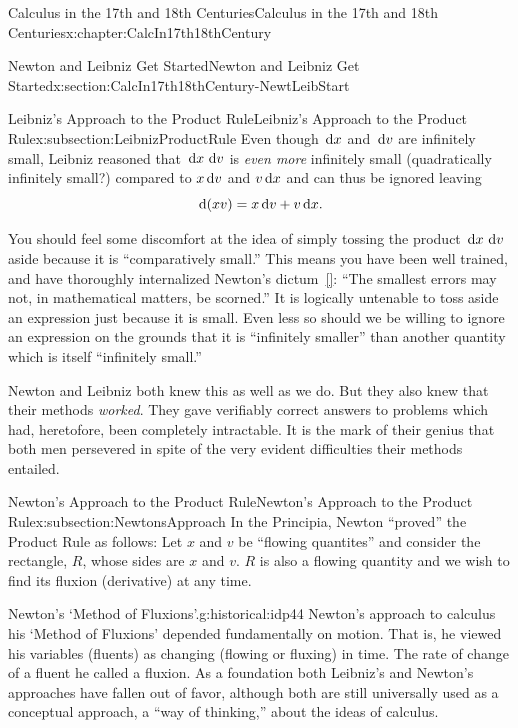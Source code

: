 \begin{chapterptx}{Calculus in the 17th and 18th Centuries}{}{Calculus in the 17th and 18th Centuries}{}{}{x:chapter:CalcIn17th18thCentury}
\begin{sectionptx}{Newton and Leibniz Get Started}{}{Newton and Leibniz Get Started}{}{}{x:section:CalcIn17th18thCentury-NewtLeibStart}
\begin{subsectionptx}{Leibniz's Approach to the Product Rule}{}{Leibniz's Approach to the Product Rule}{}{}{x:subsection:LeibnizProductRule}
			Even though \(\,{\rm d} x\) and \(\,{\rm d} v\) are infinitely small, Leibniz reasoned that \(\,{\rm d} x\,\,{\rm d} v\) is \emph{even more} infinitely small (quadratically infinitely small?)  compared to \(x\,{\rm d} v\) and \(v\,{\rm d} x\) and can thus be ignored leaving%
			\begin{equation*}
				\,{\rm d} (xv)=x\,{\rm d} v+v\,{\rm d} x\text{.}
			\end{equation*}
			\par
			You should feel some discomfort at the idea of simply tossing the product \(\,{\rm d} x\,\,{\rm d} v\) aside because it is ``comparatively small.'' This means you have been well trained, and have thoroughly internalized Newton's  dictum~\hyperlink{x:biblio:newton45__sir_isaac_two_treat_quadr}{[{}]}: ``The smallest errors may not, in mathematical matters, be scorned.'' It is logically untenable to toss aside an expression just because it is small.  Even less so should we be willing to ignore an expression on the grounds that it is ``infinitely smaller'' than another quantity which is itself ``infinitely small.''%
			\par
			Newton and Leibniz both knew this as well as we do.  But they also knew that their methods \emph{worked}.  They gave verifiably correct answers to problems which had, heretofore, been completely intractable.  It is the mark of their genius that both men persevered in spite of the very evident difficulties their methods entailed.%
		\end{subsectionptx}
		\typeout{************************************************}
		\typeout{************************************************}
		\begin{subsectionptx}{Newton's Approach to the Product Rule}{}{Newton's Approach to the Product Rule}{}{}{x:subsection:NewtonsApproach}
			In the Principia, Newton ``proved'' the Product Rule as follows: Let \(x\) and \(v\) be ``flowing quantites'' and consider the rectangle, \(R\), whose sides are \(x\) and \(v\).  \(R\) is also a flowing quantity and we wish to find its fluxion (derivative) at any time.%
			\begin{historical}{Newton's `Method of Fluxions'.}{g:historical:idp44}%
				Newton's approach to calculus \textemdash{} his `Method of Fluxions' \textemdash{} depended fundamentally on motion. That is, he viewed his variables (fluents) as changing (flowing or fluxing) in time.  The rate of change of a fluent he called a fluxion.  As a foundation both Leibniz's and Newton's approaches have fallen out of favor, although both are still universally used as a conceptual approach, a ``way of thinking,'' about the ideas of calculus.%

\end{historical}
\end{subsectionptx}
\end{sectionptx}
\end{chapterptx}
